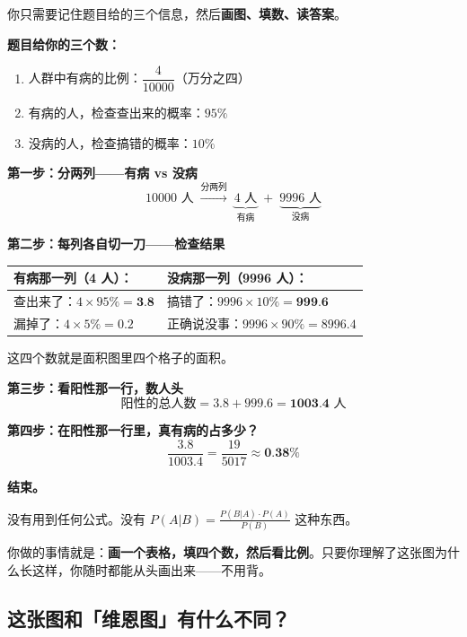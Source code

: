 \documentclass[12pt,a4paper]{article}
\begin{document}
\begin{storybox}
你只需要记住题目给的三个信息，然后\textbf{画图、填数、读答案}。

\textbf{题目给你的三个数：}
\begin{enumerate}[leftmargin=2em]
  \item 人群中有病的比例：$\dfrac{4}{10000}$（万分之四）
  \item 有病的人，检查查出来的概率：$95\%$
  \item 没病的人，检查搞错的概率：$10\%$
\end{enumerate}

\textbf{第一步：分两列——有病 vs 没病}
$$10000 \text{ 人} \;\xrightarrow{\text{分两列}}\; \underbrace{4 \text{ 人}}_{\text{有病}} \;+\; \underbrace{9996 \text{ 人}}_{\text{没病}}$$

\textbf{第二步：每列各自切一刀——检查结果}
\begin{center}
\renewcommand{\arraystretch}{1.4}
\begin{tabular}{p{4.5cm}p{5.5cm}}
\textbf{有病那一列（4 人）：} & \textbf{没病那一列（9996 人）：} \\
\hline
查出来了：$4 \times 95\% = \textbf{3.8}$ & 搞错了：$9996 \times 10\% = \textbf{999.6}$ \\
漏掉了：$4 \times 5\% = 0.2$ & 正确说没事：$9996 \times 90\% = 8996.4$ \\
\end{tabular}
\end{center}

这四个数就是面积图里四个格子的面积。

\textbf{第三步：看阳性那一行，数人头}
$$\text{阳性的总人数} = 3.8 + 999.6 = \textbf{1003.4 人}$$

\textbf{第四步：在阳性那一行里，真有病的占多少？}
$$\frac{3.8}{1003.4} = \frac{19}{5017} \approx \textbf{0.38\%}$$

\textbf{结束。}

没有用到任何公式。没有 $P(A|B) = \frac{P(B|A) \cdot P(A)}{P(B)}$ 这种东西。

你做的事情就是：\textbf{画一个表格，填四个数，然后看比例}。只要你理解了这张图为什么长这样，你随时都能从头画出来——不用背。
\end{storybox}

\subsection*{这张图和「维恩图」有什么不同？}
\end{document}
